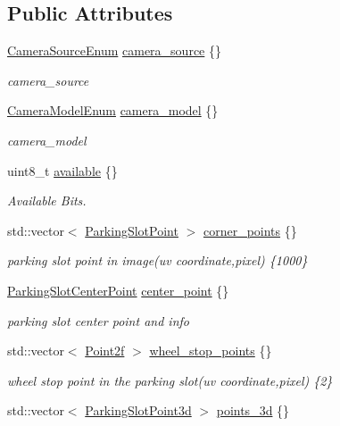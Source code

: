 \subsection*{Public Attributes}
\begin{DoxyCompactItemize}
\item 
\hyperlink{structmaf__perception__interface_1_1CameraSourceEnum}{Camera\+Source\+Enum} \hyperlink{structmaf__perception__interface_1_1ParkingSlot_a37054b7277f4ab6a3786436eadb377c3}{camera\+\_\+source} \{\}
\begin{DoxyCompactList}\small\item\em camera\+\_\+source \end{DoxyCompactList}\item 
\hyperlink{structmaf__perception__interface_1_1CameraModelEnum}{Camera\+Model\+Enum} \hyperlink{structmaf__perception__interface_1_1ParkingSlot_a167ac54a9164046b58462d76faa33438}{camera\+\_\+model} \{\}
\begin{DoxyCompactList}\small\item\em camera\+\_\+model \end{DoxyCompactList}\item 
uint8\+\_\+t \hyperlink{structmaf__perception__interface_1_1ParkingSlot_adfb158b99eeaa553c0cd0eabd7d894a7}{available} \{\}
\begin{DoxyCompactList}\small\item\em Available Bits. \end{DoxyCompactList}\item 
std\+::vector$<$ \hyperlink{structmaf__perception__interface_1_1ParkingSlotPoint}{Parking\+Slot\+Point} $>$ \hyperlink{structmaf__perception__interface_1_1ParkingSlot_a1283e56785bbd1a5a619f491253b3706}{corner\+\_\+points} \{\}
\begin{DoxyCompactList}\small\item\em parking slot point in image(uv coordinate,pixel) \{1000\} \end{DoxyCompactList}\item 
\hyperlink{structmaf__perception__interface_1_1ParkingSlotCenterPoint}{Parking\+Slot\+Center\+Point} \hyperlink{structmaf__perception__interface_1_1ParkingSlot_af02dc320cd3f69aebd5329abaedcfb0f}{center\+\_\+point} \{\}
\begin{DoxyCompactList}\small\item\em parking slot center point and info \end{DoxyCompactList}\item 
std\+::vector$<$ \hyperlink{structmaf__perception__interface_1_1Point2f}{Point2f} $>$ \hyperlink{structmaf__perception__interface_1_1ParkingSlot_af687d18557685e3b6b3bad2ab1551a19}{wheel\+\_\+stop\+\_\+points} \{\}
\begin{DoxyCompactList}\small\item\em wheel stop point in the parking slot(uv coordinate,pixel) \{2\} \end{DoxyCompactList}\item 
std\+::vector$<$ \hyperlink{structmaf__perception__interface_1_1ParkingSlotPoint3d}{Parking\+Slot\+Point3d} $>$ \hyperlink{structmaf__perception__interface_1_1ParkingSlot_a1883232973850dd00a3143c4923947a5}{points\+\_\+3d} \{\}
\end{DoxyCompactItemize}



